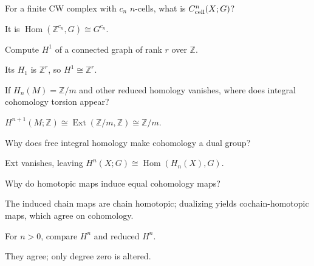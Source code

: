 \begin{problem}\label{prob:viii28-13}
For a finite CW complex with \(c_n\) \(n\)-cells, what is \(C^n_{\rm cell}(X;G)\)?
\end{problem}
\begin{solution}
It is \(\operatorname{Hom}(\mathbb Z^{c_n},G)\cong G^{c_n}\).
\end{solution}

\begin{problem}\label{prob:viii28-14}
Compute \(H^1\) of a connected graph of rank \(r\) over \(\mathbb Z\).
\end{problem}
\begin{solution}
Its \(H_1\) is \(\mathbb Z^r\), so \(H^1\cong\mathbb Z^r\).
\end{solution}

\begin{problem}\label{prob:viii28-15}
If \(H_n(M)=\mathbb Z/m\) and other reduced homology vanishes, where does integral cohomology torsion appear?
\end{problem}
\begin{solution}
\(H^{n+1}(M;\mathbb Z)\cong\operatorname{Ext}(\mathbb Z/m,\mathbb Z)\cong\mathbb Z/m\).
\end{solution}

\begin{problem}\label{prob:viii28-16}
Why does free integral homology make cohomology a dual group?
\end{problem}
\begin{solution}
Ext vanishes, leaving \(H^n(X;G)\cong\operatorname{Hom}(H_n(X),G)\).
\end{solution}

\begin{problem}[Homotopy]\label{prob:viii28-17}
Why do homotopic maps induce equal cohomology maps?
\end{problem}
\begin{solution}
The induced chain maps are chain homotopic; dualizing yields cochain-homotopic maps, which agree on cohomology.
\end{solution}

\begin{problem}[Reduced]\label{prob:viii28-18}
For \(n>0\), compare \(H^n\) and reduced \(H^n\).
\end{problem}
\begin{solution}
They agree; only degree zero is altered.
\end{solution}

